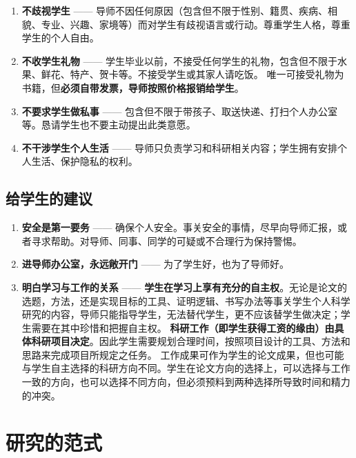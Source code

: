 \documentclass[
]{book}
\begin{document}
\begin{enumerate}
\def\labelenumi{\arabic{enumi}.}
\item
  \textbf{不歧视学生} ------
  导师不因任何原因（包含但不限于性别、籍贯、疾病、相貌、专业、兴趣、家境等）而对学生有歧视语言或行动。尊重学生人格，尊重学生的个人自由。
\item
  \textbf{不收学生礼物} ------
  学生毕业以前，不接受任何学生的礼物，包含但不限于水果、鲜花、特产、贺卡等。不接受学生或其家人请吃饭。
  唯一可接受礼物为书籍，但\textbf{必须自带发票，导师按照价格报销给学生}。
\item
  \textbf{不要求学生做私事} ------
  包含但不限于带孩子、取送快递、打扫个人办公室等。恳请学生也不要主动提出此类意愿。
\item
  \textbf{不干涉学生个人生活} ------ 导师只负责学习和科研相关内容；学生拥有安排个人生活、保护隐私的权利。
\end{enumerate}

\hypertarget{ux7ed9ux5b66ux751fux7684ux5efaux8bae}{%
\section{给学生的建议}\label{ux7ed9ux5b66ux751fux7684ux5efaux8bae}}

\begin{enumerate}
\def\labelenumi{\arabic{enumi}.}
\item
  \textbf{安全是第一要务} ------ 确保个人安全。事关安全的事情，尽早向导师汇报，或者寻求帮助。对导师、同事、同学的可疑或不合理行为保持警惕。
\item
  \textbf{进导师办公室，永远敞开门} ------ 为了学生好，也为了导师好。
\item
  \textbf{明白学习与工作的关系} ------ \textbf{学生在学习上享有充分的自主权}。无论是论文的选题，方法，还是实现目标的工具、证明逻辑、书写办法等事关学生个人科学研究的内容，导师只能指导学生，无法替代学生，更不应该替学生做决定；学生需要在其中珍惜和把握自主权。
  \textbf{科研工作（即学生获得工资的缘由）由具体科研项目决定}。因此学生需要规划合理时间，按照项目设计的工具、方法和思路来完成项目所规定之任务。
  工作成果可作为学生的论文成果，但也可能与学生自主选择的科研方向不同。学生在论文方向的选择上，可以选择与工作一致的方向，也可以选择不同方向，但必须预料到两种选择所导致时间和精力的冲突。
\end{enumerate}

\hypertarget{ResNormal}{%
\chapter{研究的范式}\label{ResNormal}}
\end{document}
